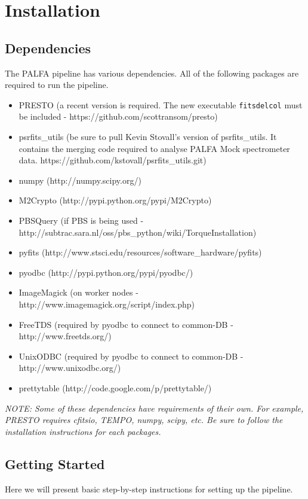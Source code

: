 \documentclass[12pt]{article}
\begin{document}
\section{Installation}
\subsection{Dependencies}
The PALFA pipeline has various dependencies. All of the following packages are required to run the pipeline.
\begin{itemize}
    \item PRESTO (a recent version is required. The new executable \texttt{fitsdelcol} must be included - https://github.com/scottransom/presto)
    \item psrfits\_utils (be sure to pull Kevin Stovall's version of psrfits\_utils. It contains the merging code required to analyse PALFA Mock spectrometer data. https://github.com/kstovall/psrfits\_utils.git)
    \item numpy (http://numpy.scipy.org/)
    \item M2Crypto (http://pypi.python.org/pypi/M2Crypto)
    \item PBSQuery (if PBS is being used - http://subtrac.sara.nl/oss/pbs\_python/wiki/TorqueInstallation)
    \item pyfits (http://www.stsci.edu/resources/software\_hardware/pyfits)
    \item pyodbc (http://pypi.python.org/pypi/pyodbc/)
    \item ImageMagick (on worker nodes - http://www.imagemagick.org/script/index.php)
    \item FreeTDS (required by pyodbc to connect to common-DB - http://www.freetds.org/)
    \item UnixODBC (required by pyodbc to connect to common-DB - http://www.unixodbc.org/)
    \item prettytable (http://code.google.com/p/prettytable/)
\end{itemize}

\textit{NOTE: Some of these dependencies have requirements of their own. For example, PRESTO requires cfitsio, TEMPO, numpy, scipy, etc. Be sure to follow the installation instructions for each packages.}

\subsection{Getting Started}
Here we will present basic step-by-step instructions for setting up the pipeline.
\end{document}
